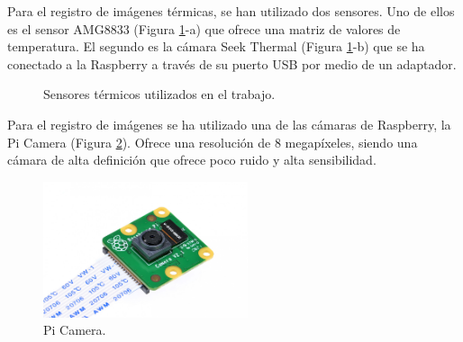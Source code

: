 Para el registro de imágenes térmicas, se han utilizado dos sensores. Uno de ellos es el sensor AMG8833 (Figura \ref{fig:termicos}-a) que ofrece una matriz de valores de temperatura. El segundo es la cámara Seek Thermal (Figura \ref{fig:termicos}-b) que se ha conectado a la Raspberry a través de su puerto USB por medio de un adaptador.\\
\begin{figure}[h!]
  \begin{center}
    \hspace{2mm}
  \end{center}
\caption{Sensores térmicos utilizados en el trabajo.} \label{fig:termicos}
\end{figure}

Para el registro de imágenes se ha utilizado una de las cámaras de Raspberry, la Pi Camera (Figura \ref{fig:picam_of}). Ofrece una resolución de 8 megapíxeles, siendo una cámara de alta definición que ofrece poco ruido y alta sensibilidad.
\begin{figure} [h!]
  \begin{center}
    \includegraphics[width=6cm]{figs/picam_of}
  \end{center}
  \caption{Pi Camera.}
  \label{fig:picam_of}
\end{figure}


